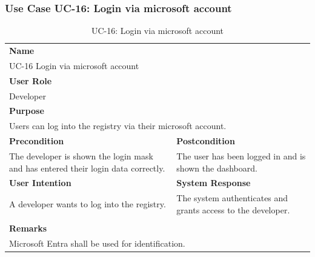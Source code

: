 \subsubsection{Use Case UC-16: Login via microsoft account}\label{subsubsec:use-case-uc-16:-login-via-microsoft-account}

\begin{table}[H]
    \centering
    \begin{tabular}{|p{}|p{}|}

        \hline
        \multicolumn{2}{|l|}{\rowcolor{gray!50}\textbf{Name}} \\
        \multicolumn{2}{|l|}{UC-16 Login via microsoft account} \\ \hline

        \multicolumn{2}{|l|}{\rowcolor{gray!50}\textbf{User Role}} \\
        \multicolumn{2}{|l|}{Developer} \\ \hline

        \multicolumn{2}{|l|}{\rowcolor{gray!50}\textbf{Purpose}} \\
        \multicolumn{2}{|l|}{Users can log into the registry via their microsoft account.} \\ \hline

        \rowcolor{gray!50}\textbf{Precondition} & \rowcolor{gray!50}\textbf{Postcondition} \\
        The developer is shown the login mask and has entered their login data correctly.
        &
        The user has been logged in and is shown the dashboard.  \\ \hline

        \rowcolor{gray!50}\textbf{User Intention} & \rowcolor{gray!50}\textbf{System Response} \\
        A developer wants to log into the registry.
        &
        The system authenticates and grants access to the developer. \\ \hline

        & \\ \hline

        \multicolumn{2}{|l|}{\rowcolor{gray!50}\textbf{Remarks}} \\
        \multicolumn{2}{|p{1\textwidth}|}{Microsoft Entra shall be used for identification.} \\ \hline
    \end{tabular}
    \caption{UC-16: Login via microsoft account}
    \label{tab:uc-login-via-microsoft-account}
\end{table}

